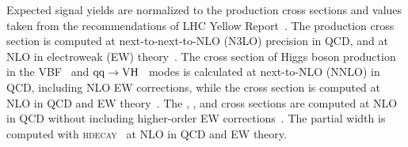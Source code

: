 \begin{table}[!htb]
    \centering
    \captionsetup{justification=centering}
    \label{tab:sig_samples}
\end{table}

Expected signal yields are normalized to the production cross sections and \brhmm values taken from the recommendations of LHC Yellow Report~\cite{deFlorian:2016spz}.
The \ggH production cross section is computed at next-to-next-to-NLO (N3LO) precision in QCD, and at NLO in electroweak (EW) theory~\cite{Anastasiou:2016cez}. 
The cross section of Higgs boson production in the VBF~\cite{Cacciari:2015jma} and ${\mathrm{q}\mathrm{q}\to\mathrm{V}\mathrm{H}}$~\cite{Brein:2003wg} modes is calculated at next-to-NLO (NNLO) in QCD, 
including NLO EW corrections, while the \ttH cross section is computed at NLO in QCD and EW theory~\cite{Dawson:2003zu,Frixione:2014qaa}. 
The \bbH, \tHq, and \tHW cross sections are computed at NLO in QCD without including higher-order EW corrections~\cite{deFlorian:2016spz,Demartin:2015uha,Demartin:2016axk}. 
The \hmm partial width is computed with \textsc{hdecay}~\cite{Djouadi:1997yw,Spira:1997dg} at NLO in QCD and EW theory.

